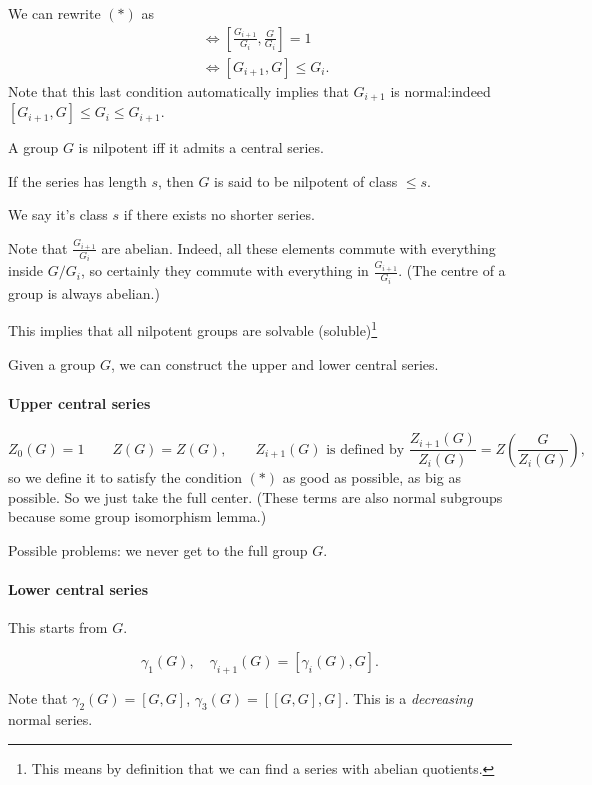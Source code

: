 We can rewrite $(*)$ as
 \begin{align*}
     &\iff \left[\frac{G_{i+1}}{G_i}, \frac{G}{G_i}\right] = 1\\
     & \iff [G_{i+1}, G] \le G_i
.\end{align*} 
Note that this last condition automatically implies that $G_{i+1}$ is normal:indeed $[G_{i+1}, G]\le G_i \le G_{i+1}$.


\begin{definition}[Nilpotent]
    A group $G$ is nilpotent iff it admits a central series.

    If the series has length $s$, then $G$ is said to be nilpotent of class $\le s$.
\end{definition}

We say it's class $s$ if there exists no shorter series.


Note that $\frac{G_{i+1}}{G_i}$ are abelian. Indeed, all these elements commute with everything inside $G / G_{i}$, so certainly they commute with everything in $\frac{G_{i+1}}{G_i}$. (The centre of a group is always abelian.)

This implies that all nilpotent groups are solvable (soluble)\footnote{This means by definition that we can find a series with abelian quotients.}


Given a group $G$, we can construct the upper and lower central series.


\paragraph{Upper central series}
\[
    Z_0(G) = 1 \qquad Z(G) = Z(G), \qquad Z_{i+1}(G) \text{ is defined by } \frac{Z_{i+1}(G)}{Z_i(G)} = Z\left(\frac{G}{Z_i(G)}\right)
,\] 
so we define it to satisfy the condition $(*)$ as good as possible, as big as possible.
So we just take the full center.
(These terms are also normal subgroups because some group isomorphism lemma.)

Possible problems: we never get to the full group $G$.

\paragraph{Lower central series}

This starts from $G$.

\[
    \gamma_1(G), \quad \gamma_{i+1}(G) = [\gamma_{i}(G), G]
.\] 

Note that $\gamma_2(G) = [G, G]$, $\gamma_3(G) = [[G, G], G]$.
This is a \emph{decreasing} normal series.

